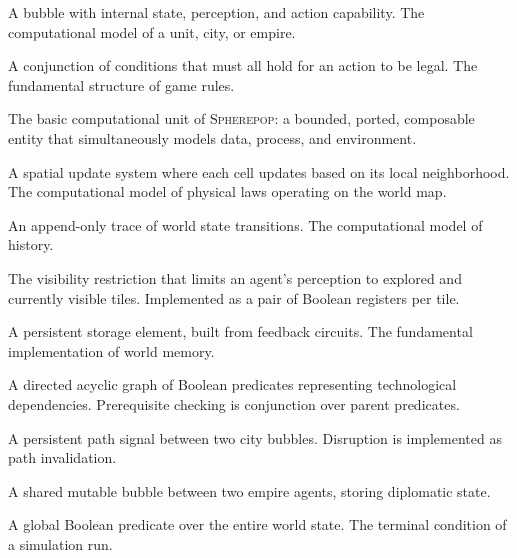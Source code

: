 \documentclass[11pt,a4paper,openany]{book}
\theoremstyle{plain}
\theoremstyle{definition}
\theoremstyle{remark}
\newcommand{\Sp}{\textsc{Spherepop}\xspace}
\begin{document}
\begin{description}[style=nextline, leftmargin=2cm]
  \item[Agent]
    A bubble with internal state, perception, and action capability.
    The computational model of a unit, city, or empire.

  \item[Boolean permission]
    A conjunction of conditions that must all hold for an action to
    be legal. The fundamental structure of game rules.

  \item[Bubble]
    The basic computational unit of \Sp{}: a bounded, ported,
    composable entity that simultaneously models data, process, and
    environment.

  \item[Cellular automaton]
    A spatial update system where each cell updates based on its
    local neighborhood. The computational model of physical laws
    operating on the world map.

  \item[Event log]
    An append-only trace of world state transitions. The computational
    model of history.

  \item[Fog of war]
    The visibility restriction that limits an agent's perception to
    explored and currently visible tiles. Implemented as a pair of
    Boolean registers per tile.

  \item[Latch / Register]
    A persistent storage element, built from feedback circuits.
    The fundamental implementation of world memory.

  \item[Technology DAG]
    A directed acyclic graph of Boolean predicates representing
    technological dependencies. Prerequisite checking is conjunction
    over parent predicates.

  \item[Trade route]
    A persistent path signal between two city bubbles. Disruption
    is implemented as path invalidation.

  \item[Treaty]
    A shared mutable bubble between two empire agents, storing
    diplomatic state.

  \item[Victory condition]
    A global Boolean predicate over the entire world state.
    The terminal condition of a simulation run.
\end{description}
\end{document}
